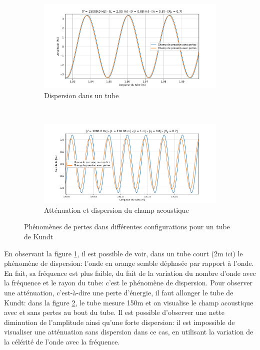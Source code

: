 \documentclass[a4paper,11pt]{article}
\begin{document}
\begin{figure}[H]
    \centering
    \begin{subfigure}[t]{0.45\linewidth}
    	\centering
		\includegraphics[width=\linewidth]{Figures/dispers.pdf}
		\caption{Dispersion dans un tube}
		\label{fig:dispers} 
    \end{subfigure}
    ~
    \begin{subfigure}[t]{0.45\linewidth}
    	\centering
		\includegraphics[width=\linewidth]{Figures/atten_dispers.pdf}
		\caption{Atténuation et dispersion du champ acoustique}
		\label{fig:atten_dispers}
    \end{subfigure}
    \caption{Phénomènes de pertes dans différentes configurations pour un tube de Kundt}\label{fig:atten_kundt}
\end{figure}

En observant la figure \ref{fig:dispers}, il est possible de voir, dans un tube court (2m ici) le phénomène de dispersion: l'onde en orange semble déphasée par rapport à l'onde. En fait, sa fréquence est plus faible, du fait de la variation du nombre d'onde avec la fréquence et le rayon du tube: c'est le phénomène de dispersion. Pour observer une atténuation, c'est-à-dire une perte d'énergie, il faut allonger le tube de Kundt: dans la figure \ref{fig:atten_dispers}, le tube mesure 150m et on visualise le champ acoustique avec et sans pertes au bout du tube. Il est possible d'observer une nette diminution de l'amplitude ainsi qu'une forte dispersion: il est impossible de visualiser une atténuation sans dispersion dans ce cas, en utilisant la variation de la célérité de l'onde avec la fréquence.
\end{document}

